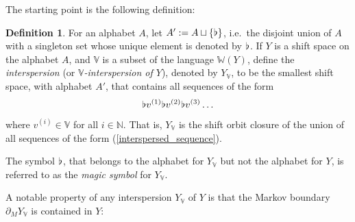 \documentclass[reqno,11pt]{amsart}
\theoremstyle{definition}
\newtheorem{defn}[thm]{Definition}
\theoremstyle{remark}
\theoremstyle{remark}
\def \N {\mathbb N}
\def\w{\mathbb{W}}
\def\v{\mathbb V}
\def\b{\kern 0.02em \flat \kern 0.02em}
\numberwithin{equation}{section}
\begin{document}
The starting point is the following definition:

\begin{defn}\label{interspersion_defn}
For an alphabet $A$, let $A':= A \sqcup \{\b\}$, i.e.~the disjoint union of $A$ with a singleton set whose unique element is denoted by $\b$.
If $Y$ is a shift space on the alphabet $A$,
and $\v$ is a subset of the language $\w(Y)$,
define the \emph{interspersion} (or \emph{$\v$-interspersion of $Y$}), denoted by
$Y_\v$, to be the smallest shift space,
with alphabet $A'$, that contains
all sequences of the form
\begin{equation}\label{interspersed_sequence}
\b v^{(1)}\b v^{(2)}\b v^{(3)}\ldots
\end{equation}
where $v^{(i)}\in \v$ for all $i\in\N$.
That is, $Y_\v$ is the shift orbit closure of the union of all sequences of the form (\ref{interspersed_sequence}).

\noindent The symbol $\b$, that belongs to the alphabet for $Y_\v$ but not the alphabet for $Y$, is referred to as the \emph{magic symbol} for $Y_\v$.
\end{defn}


A notable property of any interspersion $Y_\v$ of $Y$ is that the Markov boundary
$\partial_M Y_\v$ is contained in $Y$:
\end{document}
